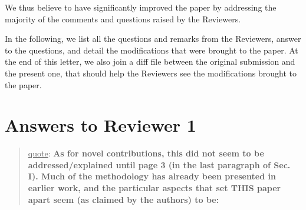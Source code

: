\documentclass[a4paper]{article}
\newcommand{\ndone}[0]{\textcolor{red}{TODO}}
\newcommand\quot[1]{\begin{quote} \underline{quote}: \textbf{#1}\end{quote}}
\begin{document}
We thus believe to have significantly improved the paper by addressing the majority of the comments and questions raised by the Reviewers.

\bigskip

In the following, we list all the questions and remarks from the Reviewers, answer to the questions, and detail the modifications that were brought to the paper.
At the end of this letter, we also join a diff file between the original submission and the present one, that should help the Reviewers see the modifications 
brought to the paper.


\section{Answers to Reviewer 1}

\quot {As for novel contributions, this did not seem to be addressed/explained
until page 3 (in the last paragraph of Sec. I). Much of the methodology
has already been presented in earlier work, and the particular aspects
that set THIS paper apart seem (as claimed by the authors) to be: 
}
\end{document}
